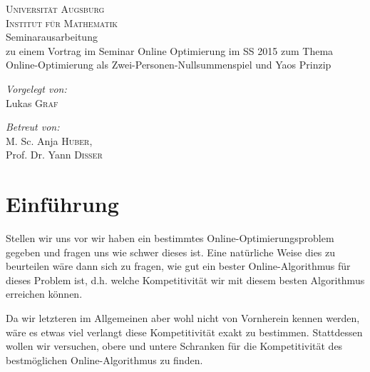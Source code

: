 \documentclass[a4paper,ngerman,12pt,bibtotoc]{scrartcl}
\theoremstyle{definition}
\theoremstyle{plain}
\theoremstyle{remark}
\renewcommand{\_}{\mathpunct{.}\,}
\newcommand{\?}{\,{:}\,}
\newcommand{\ZPNS}{Zwei-Personen-Nullsummenspiel }
\begin{document}
	\author{Lukas Graf}
	\date{Letzte Aktualisierung: \today}
	
	\thispagestyle{empty}
	
	
	\begin{titlepage}\center
	\textsc{\LARGE Universität Augsburg}\\[1.5cm]
	
	\textsc{\Large Institut für Mathematik}\\[2.5cm]
	
	{\Large Seminarausarbeitung \\[1cm]}
	zu einem Vortrag im Seminar Online Optimierung im SS 2015 zum Thema\\[1.5cm]
	{\huge Online-Optimierung als \ZPNS und Yaos Prinzip}
		
	
	\vfill
	
	\begin{minipage}{0.4\textwidth}
		\begin{flushleft} \large
			\emph{Vorgelegt von:}\\
			Lukas \textsc{Graf}
		\end{flushleft}
	\end{minipage}
	\begin{minipage}{0.4\textwidth}
		\begin{flushright} \large
			\emph{Betreut von:} \\
			M. Sc. Anja \textsc{Huber},\\Prof. Dr. Yann \textsc{Disser}
		\end{flushright}
	\end{minipage}
	
	\end{titlepage}

	\section*{Einführung}
	
	Stellen wir uns vor wir haben ein bestimmtes Online-Optimierungsproblem gegeben und fragen uns wie \glqq schwer\grqq{} dieses ist. Eine natürliche Weise dies zu beurteilen wäre dann sich zu fragen, wie gut ein bester Online-Algorithmus für dieses Problem ist, d.h. welche Kompetitivität wir mit diesem besten Algorithmus erreichen können.
	
	Da wir letzteren im Allgemeinen aber wohl nicht von Vornherein kennen werden, wäre es etwas viel verlangt diese Kompetitivität exakt zu bestimmen. Stattdessen wollen wir versuchen, obere und untere Schranken für die Kompetitivität des bestmöglichen Online-Algorithmus zu finden. 
	
\end{document}
